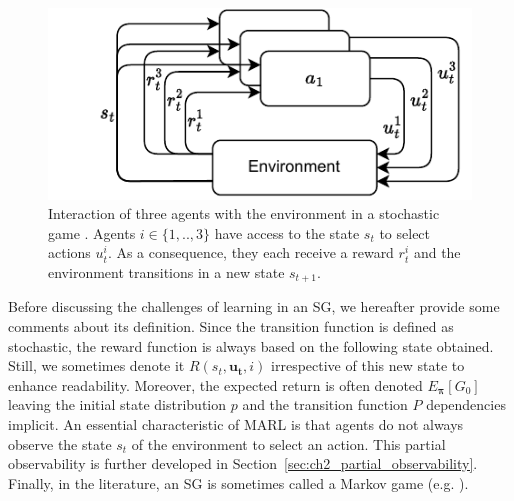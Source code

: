 \begin{figure}
    \centering
    \includegraphics[width=.8\textwidth]{tex_thesis/figures/ch2/SG.pdf}
    \caption{Interaction of three agents with the environment in a stochastic game \citep{stochasticGames}. Agents $i \in \{1,..,3\}$ have access to the state $s_t$ to select actions $u_t^i$. As a consequence, they each receive a reward $r_t^i$ and the environment transitions in a new state $s_{t+1}$.}
    \label{fig:ch2_sg}
\end{figure}

Before discussing the challenges of learning in an SG, we hereafter provide some comments about its definition. 
Since the transition function is defined as stochastic, the reward function is always based on the following state obtained.
Still, we sometimes denote it  $R(s_t, \mathbf{u_t}, i)$ irrespective of this new state to enhance readability.
Moreover, the expected return is often denoted $E_{\mathbf{\pi}} \left[ G_0 \right]$ leaving the initial state distribution $p$ and the transition function $P$ dependencies implicit.
An essential characteristic of MARL is that agents do not always observe the state $s_t$ of the environment to select an action.
This partial observability is further developed in Section~\ref{sec:ch2_partial_observability}.
Finally, in the literature, an SG is sometimes called a Markov game (e.g. \citep{MarkovGames}).

